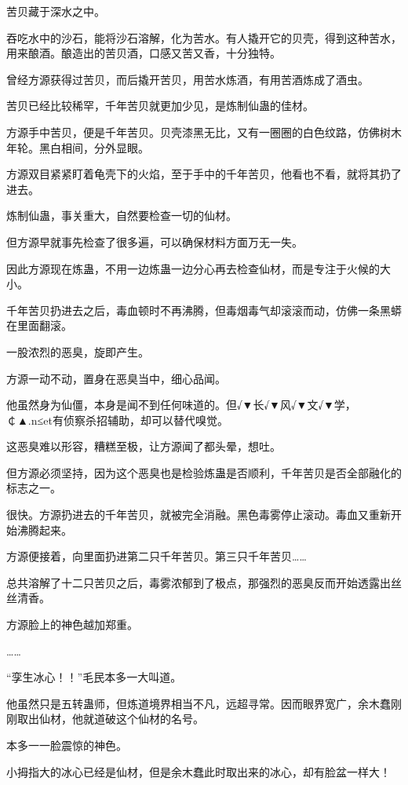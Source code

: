 
\begin{this_body}

苦贝藏于深水之中。

吞吃水中的沙石，能将沙石溶解，化为苦水。有人撬开它的贝壳，得到这种苦水，用来酿酒。酿造出的苦贝酒，口感又苦又香，十分独特。

曾经方源获得过苦贝，而后撬开苦贝，用苦水炼酒，有用苦酒炼成了酒虫。

苦贝已经比较稀罕，千年苦贝就更加少见，是炼制仙蛊的佳材。

方源手中苦贝，便是千年苦贝。贝壳漆黑无比，又有一圈圈的白色纹路，仿佛树木年轮。黑白相间，分外显眼。

方源双目紧紧盯着龟壳下的火焰，至于手中的千年苦贝，他看也不看，就将其扔了进去。

炼制仙蛊，事关重大，自然要检查一切的仙材。

但方源早就事先检查了很多遍，可以确保材料方面万无一失。

因此方源现在炼蛊，不用一边炼蛊一边分心再去检查仙材，而是专注于火候的大小。

千年苦贝扔进去之后，毒血顿时不再沸腾，但毒烟毒气却滚滚而动，仿佛一条黑蟒在里面翻滚。

一股浓烈的恶臭，旋即产生。

方源一动不动，置身在恶臭当中，细心品闻。

他虽然身为仙僵，本身是闻不到任何味道的。但√▼长√▼风√▼文√▼学，￠▲.n≤et有侦察杀招辅助，却可以替代嗅觉。

这恶臭难以形容，糟糕至极，让方源闻了都头晕，想吐。

但方源必须坚持，因为这个恶臭也是检验炼蛊是否顺利，千年苦贝是否全部融化的标志之一。

很快。方源扔进去的千年苦贝，就被完全消融。黑色毒雾停止滚动。毒血又重新开始沸腾起来。

方源便接着，向里面扔进第二只千年苦贝。第三只千年苦贝……

总共溶解了十二只苦贝之后，毒雾浓郁到了极点，那强烈的恶臭反而开始透露出丝丝清香。

方源脸上的神色越加郑重。

……

“孪生冰心！！”毛民本多一大叫道。

他虽然只是五转蛊师，但炼道境界相当不凡，远超寻常。因而眼界宽广，余木蠢刚刚取出仙材，他就道破这个仙材的名号。

本多一一脸震惊的神色。

小拇指大的冰心已经是仙材，但是余木蠢此时取出来的冰心，却有脸盆一样大！


\end{this_body}
